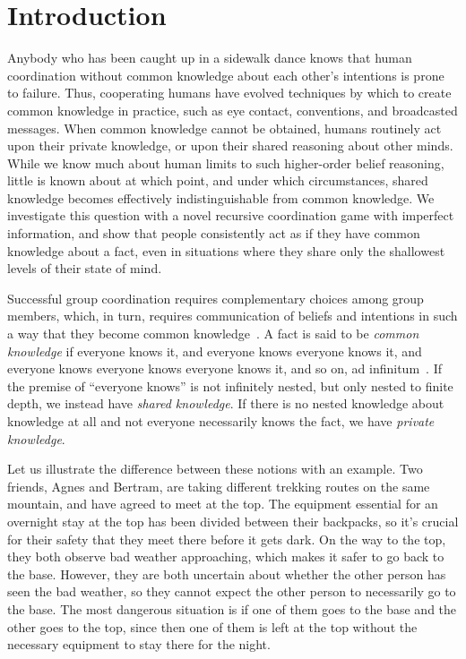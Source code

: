 \section{Introduction}
Anybody who has been caught up in a sidewalk dance knows that human coordination without common knowledge about each other's intentions is prone to failure. Thus, cooperating humans have evolved techniques by which to create common knowledge in practice, such as eye contact, conventions, and broadcasted messages. When common knowledge cannot be obtained, humans routinely act upon their private knowledge, or upon their shared reasoning about other minds. While we know much about human limits to such higher-order belief reasoning, little is known about at which point, and under which circumstances, shared knowledge becomes effectively indistinguishable from common knowledge. We investigate this question with a novel recursive coordination game with imperfect information, and show that people consistently act as if they have common knowledge about a fact, even in situations where they share only the shallowest levels of their state of mind.  

Successful group coordination requires complementary choices among group members, which, in turn, requires communication of beliefs and intentions in such a way that they become common knowledge~\cite{fagin1995reasoning}. A fact is said to be \textit{common knowledge} if everyone knows it, and everyone knows everyone knows it, and everyone knows everyone knows everyone knows it, and so on, ad infinitum~\cite{lewis1969convention, clark1981definite, schelling1980strategy, aumann1976agreeing}. If the premise of  ``everyone knows'' is not infinitely nested, but only nested to finite depth, we instead have \emph{shared knowledge}. If there is no nested knowledge about knowledge at all and not everyone necessarily knows the fact, we have \emph{private knowledge}.

Let us illustrate the difference between these notions with an example. Two friends, Agnes and Bertram, are taking different trekking routes on the same mountain, and have agreed to meet at the top. 
The equipment essential for an overnight stay at the top has been divided between their backpacks, so it's crucial for their safety that they meet there before it gets dark. 
On the way to the top, they both observe bad weather approaching, which makes it safer to go back to the base. However, they are both uncertain about whether the other person has seen the bad weather, so they cannot expect the other person to necessarily go to the base. The most dangerous situation is if one of them goes to the base and the other goes to the top, since then one of them is left at the top without the necessary equipment to stay there for the night. 

